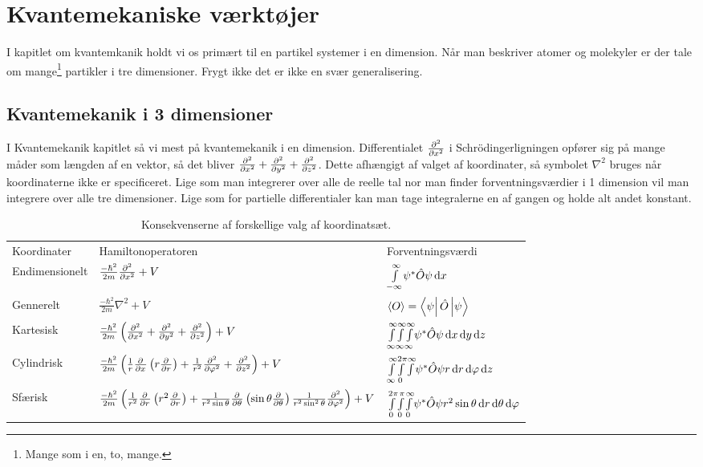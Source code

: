 \documentclass[../../Atom-ogMolekylefysik.tex]{subfiles}
\begin{document}
\section{Kvantemekaniske værktøjer}
I kapitlet om kvantemkanik holdt vi os primært til en partikel systemer i en dimension. Når man beskriver atomer og molekyler er der tale om mange\footnote{Mange som i en, to, mange.} partikler i tre dimensioner. Frygt ikke det er ikke en svær generalisering.
\subsection{Kvantemekanik i 3 dimensioner}
I Kvantemekanik kapitlet så vi mest på kvantemekanik i en dimension.
Differentialet $\pdif[2]{x}{}$ i Schrödingerligningen opfører sig på mange måder som længden af en vektor, så det bliver $\pdif[2]{x}{}+\pdif[2]{y}{}+\pdif[2]{z}{}$. Dette afhængigt af valget af koordinater, så symbolet $\nabla ^2$ bruges når koordinaterne ikke er specificeret. Lige som man integrerer over alle de reelle tal nor man finder forventningsværdier i 1 dimension vil man integrere over alle tre dimensioner. Lige som for partielle differentialer kan man tage integralerne en af gangen og holde alt andet konstant.
\begin{table}[]
    \centering
    \begin{tabular}{l l l}
Koordinater &   Hamiltonoperatoren                              &   Forventningsværdi\\
Endimensionelt & $\frac{-\hbar^2}{2m}\pdif[2]{x}{}+V$ & $\integral{\psi^*\op O\psi}{x}{-\infty}{\infty}$\\
Gennerelt   &   $\frac{-\hbar^2}{2m}\nabla^2+V$ &   $\expect O = \matrixel{\psi}{\op O}{\psi}$\\
Kartesisk   &   $\frac{-\hbar^2}{2m}\left(\pdif[2]{x}{}+\pdif[2]{y}{}+\pdif[2]{z}{}\right)+V$
&   $\integral{\integral{\integral{\psi^*\op O\psi}{x}{\-\infty}{\infty}}{y}{\-\infty}{\infty}}{z}{\-\infty}{\infty}$\\
Cylindrisk & $\frac{-\hbar^2}{2m}\left(\frac{1}{r}\pdif{x}{}\left(r\pdif{r}{}\right)+\frac{1}{r^2}\pdif[2]{\phi}{}+\pdif[2]{z}{}\right)+V$&$
\integral{\integral{\integral{\psi^*\op O\psi r}{r}{}{\infty}}{\phi}{0}{2\pi}}{z}{\-\infty}{\infty}$\\
Sfærisk &
$\frac{-\hbar^2}{2m}\left(\frac{1}{r^2}\pdif{r}{}\left(r^2\pdif{r}{}\right)+\frac{1}{r^2\sin\theta}\pdif{\theta}{}\left(\sin \theta\pdif{\theta}{}\right)\frac{1}{r^2\sin^2\theta}\pdif[2]{\phi}{}\right)+V$&
$\integral{\integral{\integral{\psi^*\op O\psi r^2\sin\theta}{r}{0}{\infty}}{\theta}{0}{\pi}}{\phi}{0}{2\pi}$
    \end{tabular}
    \caption{Konsekvenserne af forskellige valg af koordinatsæt.}
    \label{tab:kvant:koordinat}
\end{table}
\end{document}
